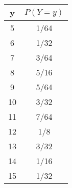 \begin{tabular}{|c|c|}
\hline
y  & $P(Y=y)$ \\ \hline
5  & 1/64     \\ \hline
6  & 1/32     \\ \hline
7  & 3/64     \\ \hline
8  & 5/16        \\ \hline
9  & 5/64       \\ \hline
10 & 3/32       \\ \hline
11 & 7/64          \\ \hline
12 & 1/8         \\ \hline
13 & 3/32        \\ \hline
14 & 1/16         \\ \hline
15 & 1/32         \\ \hline
\end{tabular}
